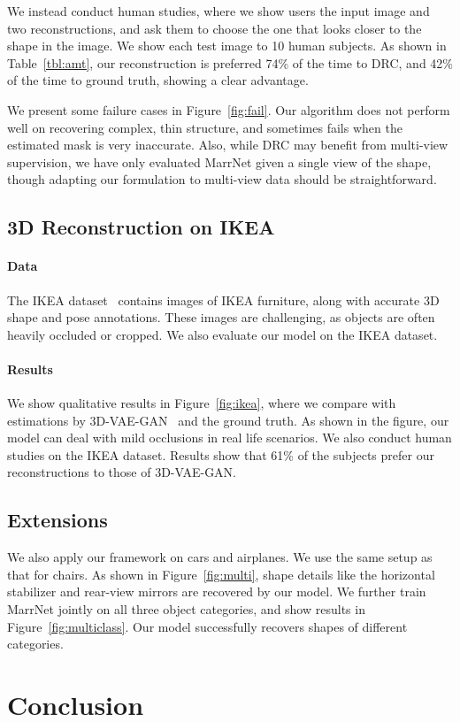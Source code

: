 \documentclass{article}
\newcommand{\fig}[1]{Figure~\ref{#1}}
\newcommand{\tbl}[1]{Table~\ref{#1}}
\newcommand{\myparagraph}[1]{\vspace{-3pt}\paragraph{#1}}
\newcommand{\model}{MarrNet\xspace}
\begin{document}
We instead conduct human studies, where we show users the input image and two reconstructions, and ask them to choose the one that looks closer to the shape in the image. We show each test image to 10 human subjects. As shown in \tbl{tbl:amt}, our reconstruction is preferred 74\% of the time to DRC, and 42\% of the time to ground truth, showing a clear advantage. 

We present some failure cases in \fig{fig:fail}. Our algorithm does not perform well on recovering complex, thin structure, and sometimes fails when the estimated mask is very inaccurate. Also, while DRC may benefit from multi-view supervision, we have only evaluated \model given a single view of the shape, though adapting our formulation to multi-view data should be straightforward. 

\subsection{3D Reconstruction on IKEA}
\paragraph{Data} 
The IKEA dataset~\citep{Lim2013} contains images of IKEA furniture, along with accurate 3D shape and pose annotations. These images are challenging, as objects are often heavily occluded or cropped. We also evaluate our model on the IKEA dataset. 

\myparagraph{Results}
We show qualitative results in \fig{fig:ikea}, where we compare with estimations by 3D-VAE-GAN~\citep{Wu2016} and the ground truth. As shown in the figure, our model can deal with mild occlusions in real life scenarios. We also conduct human studies on the IKEA dataset. Results show that 61\% of the subjects prefer our reconstructions to those of 3D-VAE-GAN. 

\subsection{Extensions}

We also apply our framework on cars and airplanes. We use the same setup as that for chairs. As shown in \fig{fig:multi}, shape details like the horizontal stabilizer and rear-view mirrors are recovered by our model. We further train \model jointly on all three object categories, and show results in \fig{fig:multiclass}. Our model successfully recovers shapes of different categories. 

 \section{Conclusion}
\end{document}
